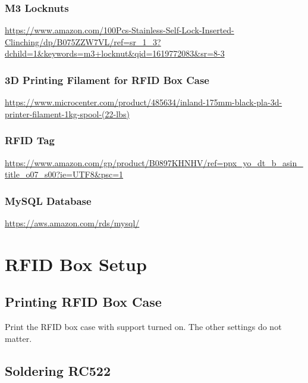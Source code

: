 \documentclass[12pt]{article}
\begin{document}
\begin{spacing}{1.2}
\subsubsection{M3 Locknuts}

\url{https://www.amazon.com/100Pcs-Stainless-Self-Lock-Inserted-Clinching/dp/B075ZZW7VL/ref=sr_1_3?dchild=1&keywords=m3+locknut&qid=1619772083&sr=8-3}

\subsubsection{3D Printing Filament for RFID Box Case}

\url{https://www.microcenter.com/product/485634/inland-175mm-black-pla-3d-printer-filament-1kg-spool-(22-lbs)}

\subsubsection{RFID Tag}

\url{https://www.amazon.com/gp/product/B0897KHNHV/ref=ppx_yo_dt_b_asin_title_o07_s00?ie=UTF8&psc=1}

\subsubsection{MySQL Database}

\url{https://aws.amazon.com/rds/mysql/}

\section{RFID Box Setup}

\subsection{Printing RFID Box Case}

Print the RFID box case with support turned on. The other settings do not matter.

\subsection{Soldering RC522}


\end{spacing}
\end{document}

